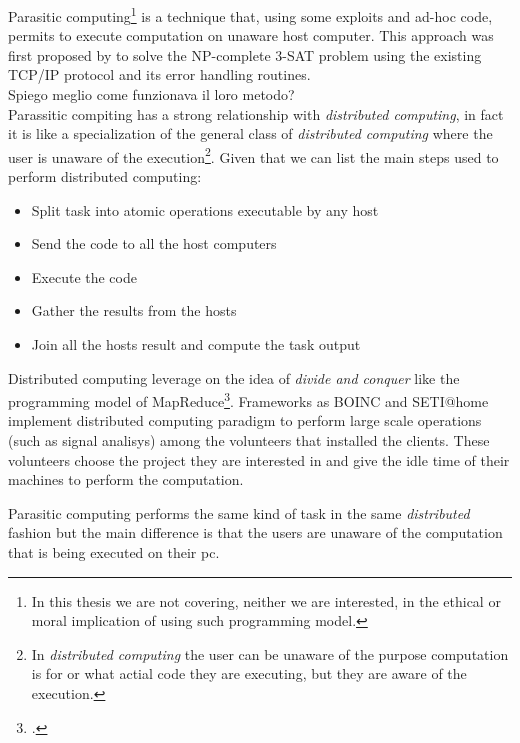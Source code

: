 Parasitic computing\footnote{In this thesis we are not covering, neither
we are interested, in the ethical or moral implication of using such programming model.}
is a technique that, using some exploits and ad-hoc code,
permits to execute computation on unaware host computer. This approach was first
proposed by \cite{barabasi2001parasitic} to solve the NP-complete 3-SAT problem
using the existing TCP/IP protocol and its error handling routines.\\

Spiego meglio come funzionava il loro metodo?\\

Parassitic compiting has a strong relationship with \emph{distributed computing}, in
fact it is like a specialization of the general class of \emph{distributed computing}
where the user is unaware of the execution\footnote{In \emph{distributed computing}
the user can be unaware of the purpose computation is for or what actial code they are
executing, but they are aware of the execution.}.
Given that we can list the main steps used to perform distributed computing:
\begin{itemize}
	\item Split task into atomic operations executable by any host
	\item Send the code to all the host computers
	\item Execute the code
	\item Gather the results from the hosts
	\item Join all the hosts result and compute the task output
\end{itemize}

Distributed computing leverage on the idea of \emph{divide and conquer} like the
programming model of MapReduce\footcite{dean2008mapreduce}. Frameworks as
\ac{BOINC} and \ac{SETI@home} implement distributed computing paradigm to perform large
scale operations (such as signal analisys) among the volunteers that installed the
clients. These volunteers choose the project they are interested in and give the
idle time of their machines to perform the computation.

Parasitic computing performs the same kind of task in the same \emph{distributed} fashion
but the main difference is that the users are unaware of the computation that is being
executed on their pc.

